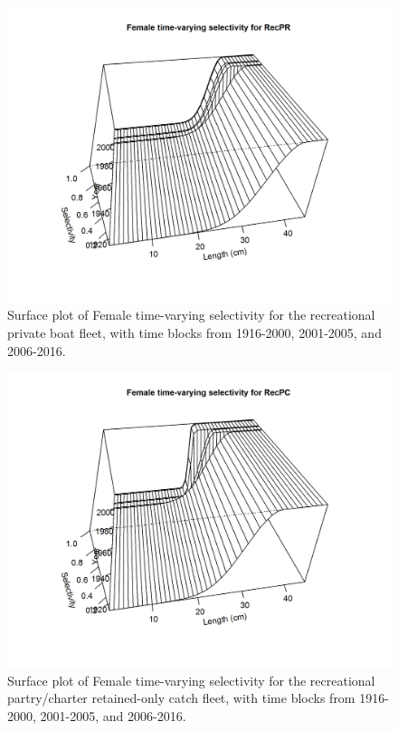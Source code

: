 \documentclass[12pt,]{article}
\begin{document}
\begin{figure}[htbp]
\centering
\includegraphics{r4ss/plots_mod1/sel03_len_timevary_surf_flt4sex1.png}
\caption{Surface plot of Female time-varying selectivity for the
recreational private boat fleet, with time blocks from 1916-2000,
2001-2005, and 2006-2016. \label{fig:sel03_len_timevary_surf_flt4sex1}}
\end{figure}

\begin{figure}[htbp]
\centering
\includegraphics{r4ss/plots_mod1/sel03_len_timevary_surf_flt5sex1.png}
\caption{Surface plot of Female time-varying selectivity for the
recreational partry/charter retained-only catch fleet, with time blocks
from 1916-2000, 2001-2005, and 2006-2016.
\label{fig:sel03_len_timevary_surf_flt5sex1}}
\end{figure}
\end{document}
